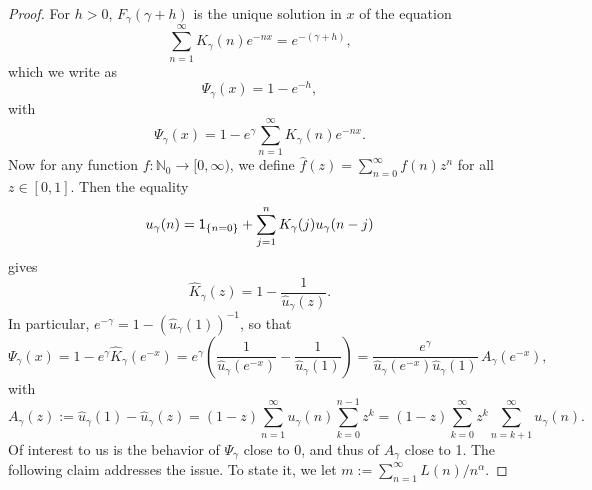 \documentclass[10pt]{amsart}
\theoremstyle{definition}\newtheorem{defi}[theo]{Definition}\newtheorem{rema}[theo]{Remark}\newtheorem{exam}[theo]{Example}\newtheorem{exem}[theo]{Example}\newtheorem{nota}[theo]{Notation}
\newcommand{\bbN}{{\ensuremath{\mathbb N}}}
\newcommand{\ga}{\alpha}
\newcommand{\gga}{\gamma}
\newcommand{\ind}{{\sf 1}}
\newcommand{\hK}{\hat K}
\begin{document}
\begin{proof}
For $h > 0$, $F_\gga(\gga + h)$ is the unique solution in $x$ of the equation
\begin{equation}
\sum_{n=1}^\infty K_\gga(n) e^{- n x} = e^{- (\gga + h)},
\end{equation}
which we write as
\begin{equation}\label{FreeEnergyEquation}
\Psi_\gga(x) = 1 - e^{- h},
\end{equation}
with
\begin{equation}
\Psi_\gga(x) = 1 - e^\gga \sum_{n=1}^\infty K_\gga(n) e^{- n x}.
\end{equation}
Now for any function $f : \bbN_0 \to [0,\infty)$, we define $\hat f(z) = \sum_{n=0}^\infty f(n) z^n$ for all $z \in [0,1]$. Then the equality
\begin{equation}
u_\gga(n) = \ind_{\{n = 0\}} + \sum_{j=1}^n K_\gga(j) u_\gga(n-j)
\end{equation}
gives
\begin{equation}
\hK_\gga(z) = 1 - \frac{1}{\hat u_\gga(z)}.
\end{equation}
In particular, $e^{- \gga} = 1 - (\hat u_\gga(1))^{-1}$, so that
\begin{equation}\label{PsiAndA}
\Psi_\gga(x) = 1 - e^\gga \hK_\gga(e^{- x}) = e^\gga \left(\frac{1}{\hat u_\gga(e^{- x})} - \frac{1}{\hat u_\gga(1)} \right) = \frac{e^\gga}{\hat u_\gga(e^{- x}) \hat u_\gga(1)} \, A_\gga(e^{- x}),
\end{equation}
with
\begin{equation}
A_\gga(z) := \hat u_\gga(1) - \hat u_\gga(z) = (1 - z) \sum_{n=1}^\infty u_\gga(n) \sum_{k=0}^{n-1} z^k = (1 - z) \sum_{k=0}^\infty z^k \sum_{n=k+1}^\infty u_\gga(n).
\end{equation}
Of interest to us is the behavior of $\Psi_\gga$ close to 0, and thus of $A_\gga$ close to 1. The following claim addresses the issue. To state it, we let $m := \sum_{n=1}^\infty L(n)/n^\ga$.


\end{proof}
\end{document}
